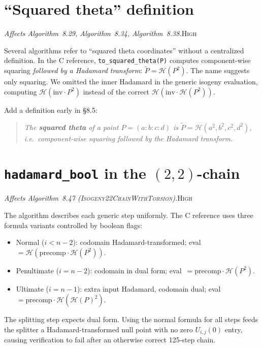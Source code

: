 \documentclass[a4paper,11pt]{article}
\newcommand{\algo}[1]{Algorithm~#1}
\newcommand{\high}{\textsc{\color{BurntOrange}High}}
\newcommand{\finding}[2]{\noindent\textit{#1}\hfill#2\par\smallskip}
\begin{document}
\section{``Squared theta'' definition}
\label{sec:squared-theta}

\finding{Affects \algo{8.29}, \algo{8.34}, \algo{8.38}.}{\high}

Several algorithms refer to ``squared theta coordinates'' without a
centralized definition.  In the C reference,
\texttt{to\_squared\_theta(P)} computes component-wise squaring
\emph{followed by a Hadamard transform}: $\tilde{P} =
\mathcal{H}(P^2)$.  The name suggests only squaring.  We omitted the
inner Hadamard in the generic isogeny evaluation, computing
$\mathcal{H}(\mathrm{inv} \cdot P^2)$ instead of the correct
$\mathcal{H}(\mathrm{inv} \cdot \mathcal{H}(P^2))$.

Add a definition early in \S8.5:
\begin{quote}
  \itshape The \textbf{squared theta} of a point $P = (a:b:c:d)$ is
  $\tilde{P} = \mathcal{H}(a^2, b^2, c^2, d^2)$, i.e.\ component-wise
  squaring followed by the Hadamard transform.
\end{quote}

\section{\texttt{hadamard\_bool} in the $(2,2)$-chain}
\label{sec:hadamard-bool}

\finding{Affects \algo{8.47}
(\textsc{Isogeny22ChainWithTorsion}).}{\high}

The algorithm describes each generic step uniformly.  The C reference
uses three formula variants controlled by boolean flags:
\begin{itemize}[nosep]
  \item Normal ($i < n{-}2$): codomain Hadamard-transformed;
        eval~$= \mathcal{H}(\mathrm{precomp} \cdot \mathcal{H}(P^2))$.
  \item Penultimate ($i = n{-}2$): codomain in dual form;
        eval~$= \mathrm{precomp} \cdot \mathcal{H}(P^2)$.
  \item Ultimate ($i = n{-}1$): extra input Hadamard, codomain dual;
        eval~$= \mathrm{precomp} \cdot \mathcal{H}(\mathcal{H}(P)^2)$.
\end{itemize}
The splitting step expects dual form.  Using the normal formula for all
steps feeds the splitter a Hadamard-transformed null point with no zero
$U_{i,j}(0)$ entry, causing verification to fail after an otherwise
correct 125-step chain.
\end{document}
